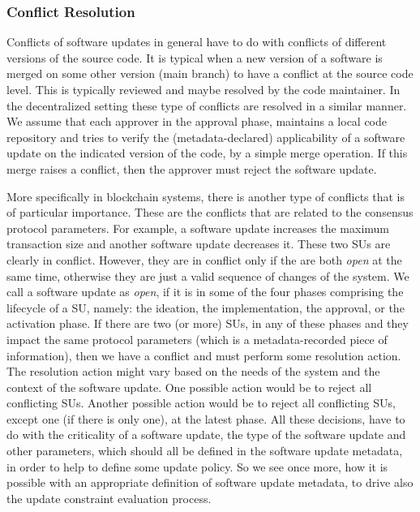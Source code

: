 \subsubsection{Conflict Resolution}
Conflicts of software updates in general have to do with conflicts of different versions of the source code. It is typical when a new version of a software is merged on some other version (main branch) to have a conflict at the source code level. This is typically reviewed and maybe resolved by the code maintainer. In the decentralized setting these type of conflicts are resolved in a similar manner. We assume that each approver in the approval phase, maintains a local code repository and tries to verify the (metadata-declared) applicability of a software update on the indicated version of the code, by a simple merge operation. If this merge raises a conflict, then the approver must reject the software update.

More specifically in blockchain systems, there is another type of conflicts that is of particular importance. These are the conflicts that are related to the consensus protocol parameters. For example, a software update increases the maximum transaction size and another software update decreases it. These two SUs are clearly in conflict. However, they are in conflict only if the are both \emph{open} at the same time, otherwise they are just a valid sequence of changes of the system. We call a software update as \emph{open}, if it is in some of the four phases comprising the lifecycle of a SU, namely: the ideation, the implementation, the approval, or the activation phase. If there are two (or more) SUs, in any of these phases and they impact the same protocol parameters (which is a metadata-recorded piece of information), then we have a conflict and must perform some resolution action. The resolution action might vary based on the needs of the system and the context of the software update. One possible action would be to reject all conflicting SUs. Another possible action would be to reject all conflicting SUs, except one (if there is only one), at the latest phase. All these decisions, have to do with the criticality of a software update, the type of the software update and other parameters, which should all be defined in the software update metadata, in order to help to define some update policy. So we see once more, how it is possible with an appropriate definition of software update metadata, to drive also the update constraint evaluation process.


